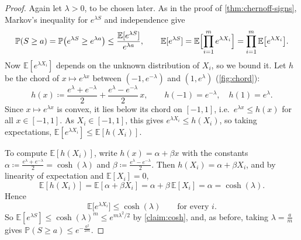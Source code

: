 \begin{proof}
    Again let \(\lambda > 0\), to be chosen later. As in the proof of \autoref{thm:chernoff-signs}, Markov's inequality for \(e^{\lambda S}\) and independence give
    \[
        \mathbb{P}(S \ge a) = \mathbb{P}\bigl( e^{\lambda S} \ge e^{\lambda a} \bigr) \le \frac{\mathbb{E}[e^{\lambda S}]}{e^{\lambda a}},
        \qquad
        \mathbb{E}[e^{\lambda S}] = \mathbb{E}\Bigl[ \prod_{i=1}^{m} e^{\lambda X_{i}} \Bigr] = \prod_{i=1}^{m} \mathbb{E}\bigl[ e^{\lambda X_{i}} \bigr] .
    \]
    Now \(\mathbb{E}[e^{\lambda X_{i}}]\) depends on the unknown distribution of \(X_{i}\), so we bound it. Let \(h\) be the chord of \(x \mapsto e^{\lambda x}\) between \((-1, e^{-\lambda})\) and \((1, e^{\lambda})\) (\autoref{fig:chord}):
    \[
        h(x) \coloneqq \frac{e^{\lambda} + e^{-\lambda}}{2} + \frac{e^{\lambda} - e^{-\lambda}}{2} \, x ,
        \qquad h(-1) = e^{-\lambda}, \quad h(1) = e^{\lambda} .
    \]
    Since \(x \mapsto e^{\lambda x}\) is convex, it lies below its chord on \([-1, 1]\), i.e.\ \(e^{\lambda x} \le h(x)\) for all \(x \in [-1, 1]\). As \(X_{i} \in [-1, 1]\), this gives \(e^{\lambda X_{i}} \le h(X_{i})\), so taking expectations, \(\mathbb{E}[e^{\lambda X_{i}}] \le \mathbb{E}[h(X_{i})]\).

    To compute \(\mathbb{E}[h(X_{i})]\), write \(h(x) = \alpha + \beta x\) with the constants \(\alpha \coloneqq \frac{e^{\lambda} + e^{-\lambda}}{2} = \cosh(\lambda)\) and \(\beta \coloneqq \frac{e^{\lambda} - e^{-\lambda}}{2}\). Then \(h(X_{i}) = \alpha + \beta X_{i}\), and by linearity of expectation and \(\mathbb{E}[X_{i}] = 0\),
    \[
        \mathbb{E}[h(X_{i})] = \mathbb{E}[\alpha + \beta X_{i}] = \alpha + \beta \, \mathbb{E}[X_{i}] = \alpha = \cosh(\lambda) .
    \]
    Hence
    \[
        \mathbb{E}\bigl[ e^{\lambda X_{i}} \bigr] \le \cosh(\lambda) \qquad \text{for every } i .
    \]
    So \(\mathbb{E}[e^{\lambda S}] \le \cosh(\lambda)^{m} \le e^{m\lambda^{2}/2}\) by \autoref{claim:cosh}, and, as before, taking \(\lambda = \frac{a}{m}\) gives \(\mathbb{P}(S \ge a) \le e^{-\frac{a^{2}}{2m}}\).
\end{proof}

